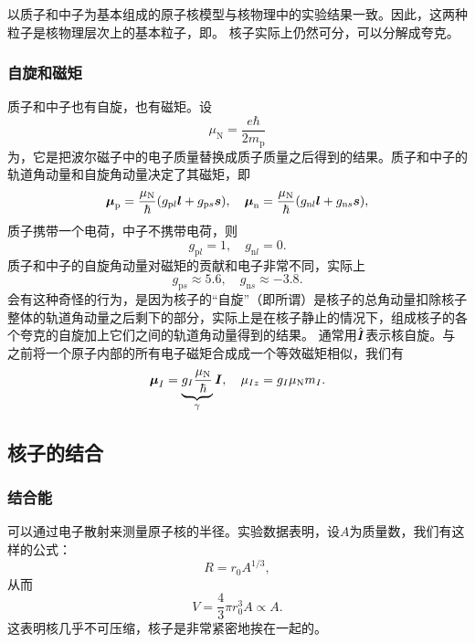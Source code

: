 以质子和中子为基本组成的原子核模型与核物理中的实验结果一致。因此，这两种粒子是核物理层次上的基本粒子，即。
核子实际上仍然可分，可以分解成夸克。

\subsubsection{自旋和磁矩}

质子和中子也有自旋，也有磁矩。设
\begin{equation}
    \mu_\text{N} = \frac{e \hbar}{2 m_\text{p}}
\end{equation}
为，它是把波尔磁子中的电子质量替换成质子质量之后得到的结果。质子和中子的轨道角动量和自旋角动量决定了其磁矩，即
\begin{equation}
    \vb*{\mu}_\text{p} = \frac{\mu_\text{N}}{\hbar} (g_{\text{p} l} \vb*{l} + g_{\text{p} s} \vb*{s}), \quad 
    \vb*{\mu}_\text{n} = \frac{\mu_\text{N}}{\hbar} (g_{\text{n} l} \vb*{l} + g_{\text{n} s} \vb*{s}),
\end{equation}
质子携带一个电荷，中子不携带电荷，则
\begin{equation}
    g_{\text{p}l} = 1, \quad g_{\text{n} l} = 0.
\end{equation}
质子和中子的自旋角动量对磁矩的贡献和电子非常不同，实际上
\begin{equation}
    g_{\text{p} s} \approx 5.6, \quad g_{\text{n} s} \approx -3.8.
\end{equation}
会有这种奇怪的行为，是因为核子的“自旋”（即所谓）是核子的总角动量扣除核子整体的轨道角动量之后剩下的部分，实际上是在核子静止的情况下，组成核子的各个夸克的自旋加上它们之间的轨道角动量得到的结果。
通常用$\hat{\vb*{I}}$表示核自旋。与之前将一个原子内部的所有电子磁矩合成成一个等效磁矩相似，我们有
\begin{equation}
    \vb*{\mu}_I = \underbrace{g_I \frac{\mu_\text{N}}{\hbar}}_\gamma \vb*{I}, \quad \mu_{Iz} = g_I \mu_\text{N} m_I.
\end{equation}

\subsection{核子的结合}

\subsubsection{结合能}

可以通过电子散射来测量原子核的半径。实验数据表明，设$A$为质量数，我们有这样的公式：
\begin{equation}
    R = r_0 A^{1/3},
\end{equation}
从而
\[
    V = \frac{4}{3} \pi r_0^3 A \propto A.
\]
这表明核几乎不可压缩，核子是非常紧密地挨在一起的。

